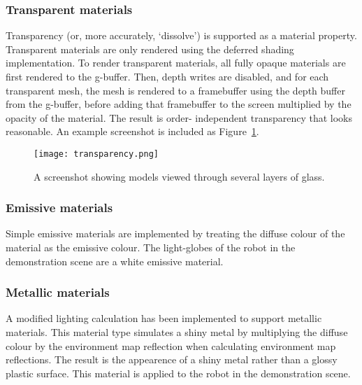 \documentclass[11pt]{scrartcl} %
\begin{document}
        \subsubsection{Transparent materials}

            Transparency (or, more accurately, `dissolve') is supported as a
            material property. Transparent materials are only rendered using
            the deferred shading implementation. To render transparent
            materials, all fully opaque materials are first rendered to the
            g-buffer. Then, depth writes are disabled, and for each transparent
            mesh, the mesh is rendered to a framebuffer using the depth buffer
            from the g-buffer, before adding that framebuffer to the screen
            multiplied by the opacity of the material. The result is order-
            independent transparency that looks reasonable.
            An example screenshot is included as Figure~\ref{fig:transparent}.

            \begin{figure}%
                \centering
                \texttt{[image: transparency.png]}
                \caption[Transparent materials]{
                    A screenshot showing models viewed through several layers of glass.
                }
                \label{fig:transparent}
            \end{figure}

        \subsubsection{Emissive materials}

            Simple emissive materials are implemented by treating the diffuse
            colour of the material as the emissive colour. The light-globes of
            the robot in the demonstration scene are a white emissive material.

        \subsubsection{Metallic materials}

            A modified lighting calculation has been implemented to support
            metallic materials. This material type simulates a shiny metal by
            multiplying the diffuse colour by the environment map reflection
            when calculating environment map reflections. The result is the
            appearence of a shiny metal rather than a glossy plastic surface.
            This material is applied to the robot in the demonstration scene.
\end{document}
